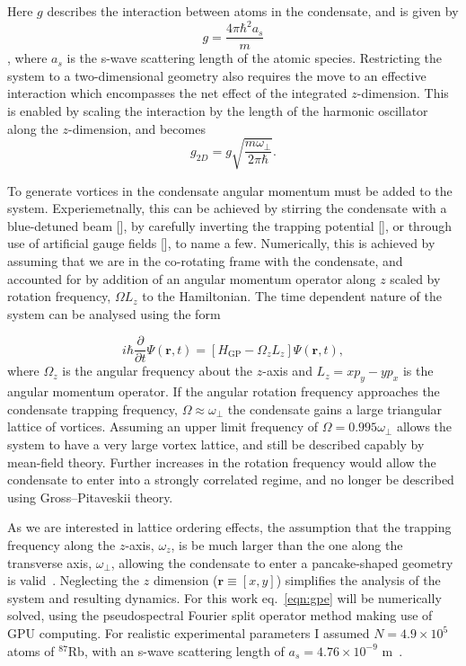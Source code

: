 Here $g$ describes the interaction between atoms in the condensate, and is given by \begin{equation}
g = \frac{4\pi\hbar^2a_s}{m}
\end{equation},
where $a_s$ is the s-wave scattering length of the atomic species. Restricting the system to a two-dimensional geometry also requires the move to an effective interaction which encompasses the net effect of the integrated $z$-dimension. This is enabled by scaling the interaction by the length of the harmonic oscillator along the $z$-dimension, and becomes
\begin{equation}
g_{2D} = g\sqrt{\frac{m\omega_\perp}{2\pi\hbar}}.
\end{equation}

To generate vortices in the condensate angular momentum must be added to the system. Experiemetnally, this can be achieved by stirring the condensate with a blue-detuned beam [], by carefully inverting the trapping potential [], or through use of artificial gauge fields [], to name a few. Numerically, this is achieved by assuming that we are in the co-rotating frame with the condensate, and accounted for by addition of an angular momentum operator along $z$ scaled by rotation frequency, $\Omega L_z$ to the Hamiltonian. The time dependent nature of the system can be analysed using the form

\begin{equation}\label{eqn:gpe}
	i\hbar\frac{\partial}{\partial t}\Psi(\mathbf{r},t) = \left[ H_{\text{GP}}  -  \Omega_z L_z \right] \Psi(\mathbf{r},t),
\end{equation}
where $\Omega_z$ is the angular frequency about the $z$-axis and $L_z = xp_y - yp_x$ is the angular momentum operator. If the angular rotation frequency approaches the condensate trapping frequency, $\Omega \approx \omega_\perp$ the condensate gains a large triangular lattice of vortices. Assuming an upper limit frequency of $\Omega = 0.995\omega_\perp$ allows the system to have a very large vortex lattice, and still be described capably by mean-field theory. Further increases in the rotation frequency would allow the condensate to enter into a strongly correlated regime, and no longer be described using Gross--Pitaveskii theory.

As we are interested in lattice ordering effects, the assumption that the trapping frequency along the $z$-axis, $\omega_z$, is be much larger than the one along the transverse axis, $\omega_\perp$,  allowing the condensate to enter a pancake-shaped geometry is valid~\cite{BEC:Fetter_revmodphys_2009}. Neglecting the $z$ dimension ($\textbf{r}\equiv [x,y]$) simplifies the analysis of the system and resulting dynamics. For this work eq.~\eqref{eqn:gpe} will be numerically solved, using the pseudospectral Fourier split operator method making use of GPU computing\cite{NUMERICS}. For realistic experimental parameters I assumed  $N=4.9\times 10^5$ atoms of $^{87}$Rb, with an s-wave scattering length of $a_s=4.76\times10^{-9}$ m~\cite{BEC:Roberts_prl_1998}.

